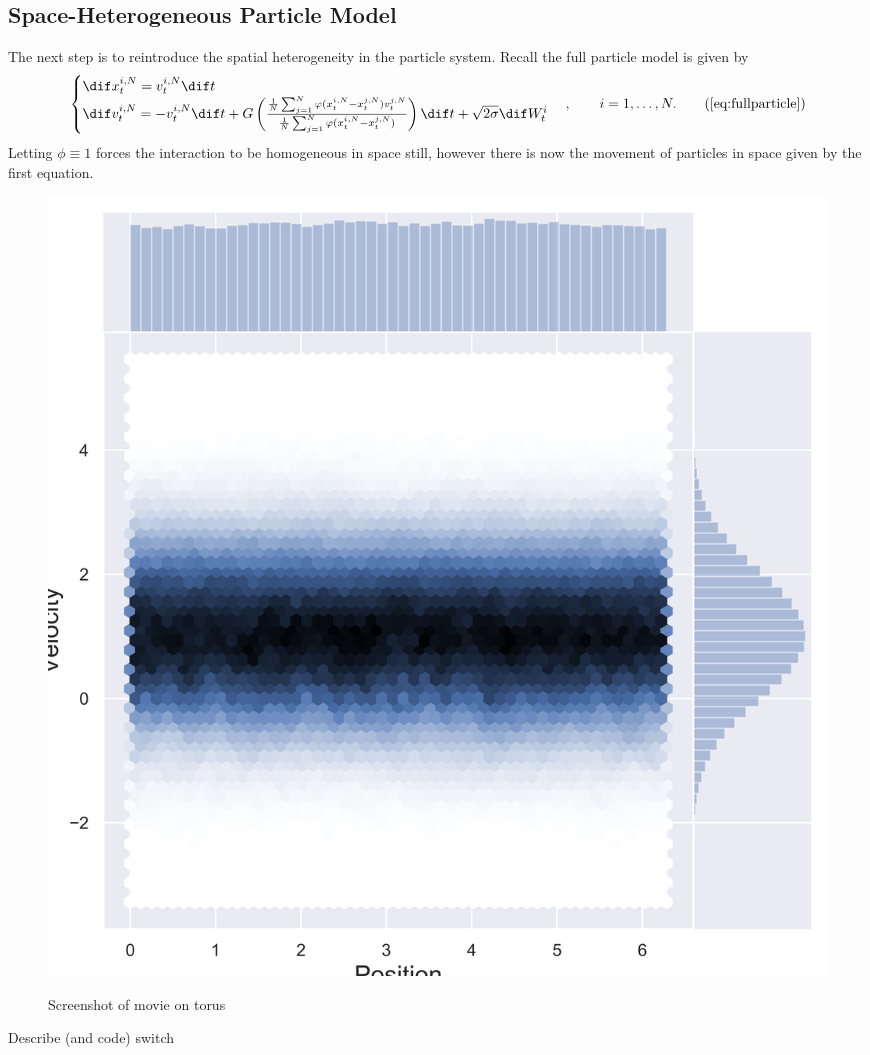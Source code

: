 \subsection{Space-Heterogeneous Particle Model}\label{sec:hetkin}
    The next step is to reintroduce the spatial heterogeneity in the particle system. Recall the full particle model is given by
            \begin{equation}\begin{cases}
    \dif x^{i,N}_t = v^{i,N}_t\dif t\\
    \dif v^{i,N}_t = -v^{i,N}_t\dif t + G\left(\frac{\frac{1}{N}\sum_{j=1}^N \phi(x_t^{i,N} - x_t^{j,N})v^{j,N}_t  }{\frac{1}{N}\sum_{j=1}^N \phi(x_t^{i,N} - x_t^{j,N})}\right)\dif t + \sqrt{2\sigma} \dif W^i_t 
    \end{cases}, \qquad  i = 1,\dots,N.\tag{\ref{eq:fullparticle}}
    \end{equation} 
    Letting $\phi\equiv 1$ forces the interaction to be homogeneous in space still, however there is now the movement of particles in space given by the first equation. 
    \begin{figure}
        \centering
        \includegraphics[width=0.7\linewidth]{Figures/hetjointplot}
        \caption[Joint Plot showing marginals of space-heterogeneous particle model]{}
        \label{fig:hetjointplot}
    \end{figure}

    \begin{figure}
        \centering
        \caption[]{Screenshot of movie on torus}
        \label{fig:hetjointplot}
    \end{figure}

Describe (and code) switch
    
    
